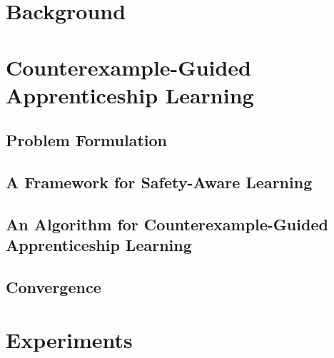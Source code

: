 \chapter{Background}
\label{sec:background}
\thispagestyle{myheadings}



\chapter{Counterexample-Guided Apprenticeship Learning}

\section{Problem Formulation}
\label{sec:section3}
\graphicspath{{2_Body/section3/figures/}}


\section{A Framework for Safety-Aware Learning}
\label{sec:section4}
\graphicspath{{2_Body/section4/figures/}}


\section{An Algorithm for Counterexample-Guided Apprenticeship Learning}
\label{sec:section5}
\graphicspath{{2_Body/section5/figures/}}


\section{Convergence}
\label{sec:section6}
\graphicspath{{2_Body/section6/figures/}}


\chapter{Experiments}
\label{sec:exp}
\graphicspath{{2_Body/experiments/figures/}}

